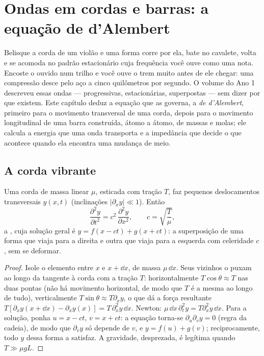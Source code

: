\chapter{Ondas em cordas e barras: a equação de d'Alembert}\label{ch:b2:waves-on-strings}

Belisque a corda de um violão e uma forma corre por ela, bate no
cavalete, volta e se acomoda no padrão estacionário cuja
frequência você ouve como uma nota. Encoste o ouvido num trilho e
você ouve o trem muito antes de ele chegar: uma compressão desce pelo
aço a cinco quilômetros por segundo. O volume do Ano 1 descreveu essas
ondas --- progressivas, estacionárias, superpostas --- sem dizer por que
existem. Este capítulo deduz a equação que as governa, a
\emph{ de d'Alembert}, primeiro para o movimento transversal de uma
corda, depois para o movimento longitudinal de uma barra construída, átomo a átomo,
de massas e molas; ele calcula a energia que uma onda transporta e a
impedância que decide o que acontece quando ela encontra uma mudança de meio.

\section{A corda vibrante}

\begin{theorem}\label{thm:b2:waves-on-strings:equation}
Uma corda de massa linear $\mu$, esticada com tração $T$, faz
pequenos deslocamentos transversais $y(x, t)$ (inclinações $|\partial_xy| \ll 1$). Então
\[
\frac{\partial^2y}{\partial t^2} = c^2\,\frac{\partial^2y}{\partial x^2} ,
\qquad c = \sqrt{\frac{T}{\mu}} ,
\]
a \emph{}, cuja solução geral é $y = f(x - ct)
+ g(x + ct)$: a superposição de uma forma que viaja para a direita e
outra que viaja para a esquerda com celeridade $c$, sem se deformar.
\end{theorem}

\begin{proof}
Isole o elemento entre $x$ e $x + \dd x$, de massa $\mu\,\dd x$. Seus
vizinhos o puxam ao longo da tangente à corda com a tração $T$:
horizontalmente $T\cos\theta \approx T$ nas duas pontas (não há movimento horizontal, de modo que
$T$ é a mesma ao longo de tudo), verticalmente $T\sin\theta \approx T\partial_xy$, o que
dá a força resultante $T[\partial_xy(x + \dd x) - \partial_xy(x)] = T\,\partial_x^2y\,\dd x$.
Newton: $\mu\,\dd x\,\partial_t^2y = T\partial_x^2y\,\dd x$. Para a solução, ponha
$u = x - ct$, $v = x + ct$: a equação torna-se $\partial_u\partial_vy = 0$
(regra da cadeia), de modo que $\partial_vy$ só depende de $v$, e $y = f(u) + g(v)$;
reciprocamente, todo $y$ dessa forma a satisfaz. A gravidade, desprezada, é legítima
quando $T \gg \mu gL$.
\end{proof}

